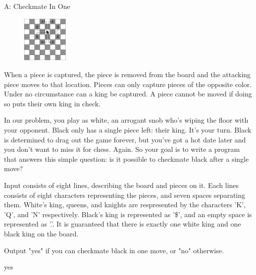 \begin{problem}{A: Checkmate In One}
\begin{figure}[h]
    \centering
    \includegraphics[width=0.2\textwidth]{knight-moves.eps}
\end{figure}

When a piece is captured, the piece is removed from the board and the attacking piece moves to that location. Pieces can only capture pieces of the opposite color. Under no circumstance can a king be captured. A piece cannot be moved if doing so puts their own king in check.

In our problem, you play as white, an arrogant snob who's wiping the floor with your opponent. Black only has a single piece left: their king. It's your turn. Black is determined to drag out the game forever, but you've got a hot date later and you don't want to miss it for chess. Again. So your goal is to write a program that answers this simple question: is it possible to checkmate black after a single move?

\end{problem}

\begin{formalin}
Input consists of eight lines, describing the board and pieces on it. Each lines consists of eight characters representing the pieces, and seven spaces separating them. White's king, queens, and knights are respresented by the characters 'K', 'Q', and 'N' respectively. Black's king is represented as '\$', and an empty space is represented as '.'. It is guaranteed that there is exactly one white king and one black king on the board.
\end{formalin}

\begin{formalout}
Output "yes" if you can checkmate black in one move, or "no" otherwise.
\end{formalout}


\begin{dataout}
yes
\end{dataout}

